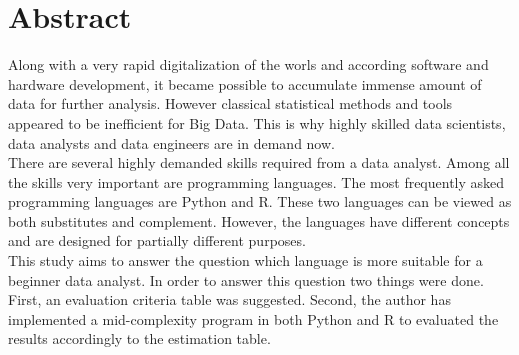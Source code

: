 \documentclass[
  twoside,
  11pt, a4paper,
  footinclude=true,
  headinclude=true,
  cleardoublepage=empty
]{scrreprt}
\begin{document}
    \chapter*{Abstract}
        \onehalfspace
        Along with a very rapid digitalization of the worls and according software and hardware development, it became possible to accumulate immense amount of data for further analysis. However classical statistical methods and tools appeared to be inefficient for Big Data. This is why highly skilled data scientists, data analysts and data engineers are in demand now. \\
        There are several highly demanded skills required from a data analyst. Among all the skills very important are programming languages. The most frequently asked programming languages are Python and R. These two languages can be viewed as both substitutes and complement. However, the languages have different concepts and are designed for partially different purposes. \\
        This study aims to answer the question which language is more suitable for a beginner data analyst. In order to answer this question two things were done. First, an evaluation criteria table was suggested. Second, the author has implemented a mid-complexity program in both Python and R to evaluated the results accordingly to the estimation table.
        \singlespace

\tableofcontents
\end{document}
